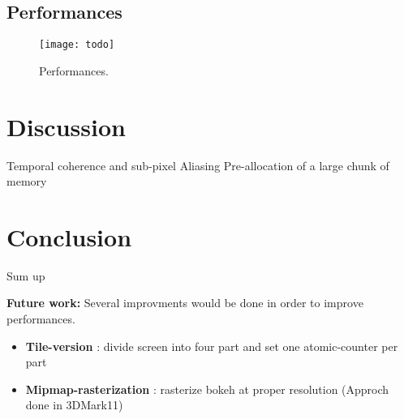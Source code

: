 \subsection{Performances}
	\begin{figure}[htb]\centering
	\texttt{[image: todo]}
	\caption{Performances.}
	\label{YourName:fig1}
	\end{figure}

\section{Discussion}
Temporal coherence and sub-pixel Aliasing
Pre-allocation of a large chunk of memory

\section{Conclusion}
Sum up

\textbf{Future work:} Several improvments would be done in order to improve performances. 
\begin{itemize}
	\item \textbf{Tile-version} : divide screen into four part and set one atomic-counter per part
	\item \textbf{Mipmap-rasterization} : rasterize bokeh at proper resolution (Approch done in 3DMark11)
\end{itemize}














